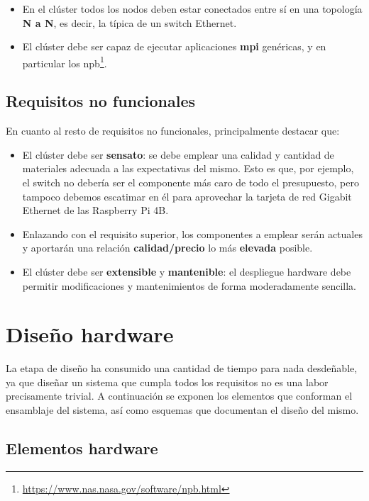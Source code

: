 \begin{itemize}
    \item En el clúster todos los nodos deben estar conectados entre sí en una topología \textbf{N a N}, es decir, la típica de un switch Ethernet.
    \item El clúster debe ser capaz de ejecutar aplicaciones \textbf{\acrshort{mpi}} genéricas, y en particular los \acrlong{npb}\footnote{\url{https://www.nas.nasa.gov/software/npb.html}}.
\end{itemize}

\subsection{Requisitos no funcionales}
En cuanto al resto de requisitos no funcionales, principalmente destacar que:
\begin{itemize}
    \item El clúster debe ser \textbf{sensato}: se debe emplear una calidad y cantidad de materiales adecuada a las expectativas del mismo. Esto es que, por ejemplo, el switch no debería ser el componente más caro de todo el presupuesto, pero tampoco debemos escatimar en él para aprovechar la tarjeta de red Gigabit Ethernet de las Raspberry Pi 4B.
    \item Enlazando con el requisito superior, los componentes a emplear serán actuales y aportarán una relación \textbf{calidad/precio} lo más \textbf{elevada} posible.
    \item El clúster debe ser \textbf{extensible} y \textbf{mantenible}: el despliegue hardware debe permitir modificaciones y mantenimientos de forma moderadamente sencilla.
\end{itemize}

\section{Diseño hardware}
\label{sec:diseño_hardware}
La etapa de diseño ha consumido una cantidad de tiempo para nada desdeñable, ya que diseñar un sistema que cumpla todos los requisitos no es una labor precisamente trivial. A continuación se exponen los elementos que conforman el ensamblaje del sistema, así como esquemas que documentan el diseño del mismo.

\subsection{Elementos hardware}

